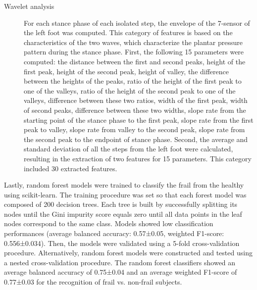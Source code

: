 \begin{description}
    \item[Wavelet analysis] For each stance phase of each isolated step, the envelope of the 7-sensor of the left foot was computed. This category of features is based on the characteristics of the two waves, which characterize the plantar pressure pattern during the stance phase. First, the following 15 parameters were computed: the distance between the first and second peaks, height of the first peak, height of the second peak, height of valley, the difference between the heights of the peaks, ratio of the height of the first peak to one of the valleys, ratio of the height of the second peak to one of the valleys, difference between these two ratios, width of the first peak, width of second peaks, difference between these two widths, slope rate from the starting point of the stance phase to the first peak, slope rate from the first peak to valley, slope rate from valley to the second peak, slope rate from the second peak to the endpoint of stance phase. Second, the average and standard deviation of all the steps from the left foot were calculated, resulting in the extraction of two features for 15 parameters. This category included 30 extracted features.
\end{description}

Lastly, random forest models were trained to classify the frail from the healthy using scikit-learn. The training procedure was set so that each forest model was composed of 200 decision trees. Each tree is built by successfully splitting its nodes until the Gini impurity score equals zero until all data points in the leaf nodes correspond to the same class.
Models showed low classification performances (average balanced accuracy: 0.57±0.05, weighted F1-score: 0.556±0.034).
Then, the models were validated using a 5-fold cross-validation procedure.  Alternatively, random forest models were constructed and tested using a nested cross-validation procedure. 
The random forest classifiers showed an average balanced accuracy of 0.75±0.04 and an average weighted F1-score of 0.77±0.03 for the recognition of frail vs. non-frail subjects.

